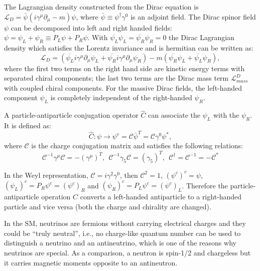 The Lagrangian density constructed from the Dirac equation is $\mathcal{L}_D = \bar\psi(i\gamma^\mu\partial_\mu-m)\psi$, where $\bar{\psi}\equiv \psi^{\dag}\gamma^0$ is an adjoint field. The Dirac spinor field $\psi$ can be decomposed into left and right handed fields: $\psi=\psi_L+\psi_R\equiv P_L\psi+P_R\psi$. With $\overline{\psi_L}\psi_L=\overline{\psi_R}\psi_R=0$ the Dirac Lagrangian density which satisfies the Lorentz invariance and is hermitian can be written as\cite{zee2010quantum}:
\begin{equation}\label{diracLagrange}
\mathcal{L}_D = (\overline{\psi_L} i\gamma^\mu\partial_\mu\psi_L+\overline{{\psi}_R} i\gamma^\mu\partial_\mu\psi_R)-m(\overline{{\psi}_R}\psi_L+\overline{{\psi}_L}\psi_R),
\end{equation} 
where the first two terms on the right hand side are kinetic energy terms with separated chiral components; the last two terms are the Dirac mass term $\mathcal{L}^{D}_{mass}$ with coupled chiral components. For the massive Dirac fields, the left-handed component $\psi_L$ is completely independent of the right-handed $\psi_R$. 

A particle-antiparticle conjugation operator $\hat C$ can associate the $\psi_L$ with the $\psi_R$. It is defined as\cite{akhmedov2014majorana}:
\begin{equation}
\hat C: \psi\to \psi^c=\mathcal{C}\bar\psi^T=\mathcal{C}\gamma^0\psi^*,
\end{equation}
where $\mathcal C$ is the charge conjugation matrix and satisfies the following relations:
\begin{equation}
\mathcal C^{-1}\gamma^\mu\mathcal C=-(\gamma^\mu)^T,~~\mathcal{C}^{-1}\gamma_5\mathcal{C}=(\gamma_5)^T,~~\mathcal{C}^\dagger = \mathcal{C}^{-1}=-\mathcal{C}^*
\end{equation}

In the Weyl representation, $\mathcal{C}=i\gamma^2\gamma^0$, then $\mathcal {C}^2=1$, $(\psi^c)^c=\psi$, $(\psi_L)^c=P_R\psi^c=(\psi^c)_R$ and $(\psi_R)^c=P_L\psi^c=(\psi^c)_L$. Therefore the particle-antiparticle operation $\hat C$ converts a left-handed antiparticle to a right-handed particle and vice versa (both the charge and chirality are changed).

In the SM, neutrinos are fermions without carrying electrical charges and they could be ``truly neutral'', i.e., no charge-like quantum number can be used to distinguish a neutrino and an antineutrino, which is one of the reasons why neutrinos are special. As a comparison, a neutron is spin-1/2 and chargeless but it carries magnetic moments opposite to an antineutron\cite{akhmedov2014majorana}.

